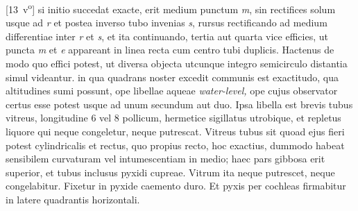 \hspace{-0.5mm}[13~v\textsuperscript{o}] si initio succedat exacte, erit medium punctum \textit{m}, sin rectifices solum usque ad \textit{r} et postea inverso tubo invenias \textit{s}, rursus rectificando ad medium differentiae inter \textit{r} et \textit{s}, et ita continuando, tertia aut quarta vice efficies, ut puncta \textit{m} et \textit{e} appareant in linea recta cum centro tubi duplicis. Hactenus de modo quo effici potest, ut diversa objecta utcunque integro semicirculo distantia simul videantur. \pend 
\count{}
\count{}
\count{}
\pstart {} in qua quadrans noster excedit communis est exactitudo, qua altitudines sumi possunt, ope libellae aqueae \textit{water-level,} ope cujus observator certus esse potest usque ad unum secundum aut duo. Ipsa libella est brevis tubus vitreus, longitudine 6 vel 8 pollicum, hermetice sigillatus utrobique, et repletus liquore qui neque congeletur, neque putrescat. Vitreus tubus sit quoad ejus fieri potest cylindricalis et rectus, quo propius recto, hoc exactius, dummodo habeat sensibilem curvaturam vel intumescentiam in medio; haec pars gibbosa erit superior, et tubus inclusus pyxidi cupreae\protect{}. Vitrum  
\pend
\newpage
\pstart\noindent  ita neque putrescet, neque congelabitur. Fixetur in pyxide caemento duro. Et pyxis per cochleas firmabitur in latere quadrantis\protect{} horizontali. 
\pend 
